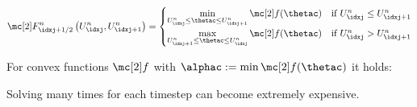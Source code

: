 \begin{defnbox}\nospacing
    \begin{defn}\label{defn:godunov_flux}
        \begin{align}
          \Flux^{n}_{\idxj+1/2}\left(U_{\idxj}^{n},U_{\idxj+1}^{n}\right)=
          \begin{cases}
            \min\limits_{U_{\idxj}^{n}\leq\thetac\leq U_{\idxj+1}^{n}}\flux(\thetac)&\text{if }U_{\idxj}^{n}\leq U_{\idxj+1}^{n}\\
            \max\limits_{U_{\idxj+1}^{n}\leq\thetac\leq U_{\idxj}^{n}}\flux(\thetac)&\text{if }U_{\idxj}^{n}> U_{\idxj+1}^{n}\label{eq:godunov_flux}
          \end{cases}
        \end{align}
    \end{defn}
\end{defnbox}
\begin{corbox}\nospacing
    \begin{cor}\label{cor:godunov_flux_for_convex_functions}\leavevmode
        For convex functions $\flux$ with $\alphac:=\min\flux(\thetac)$ it holds:
    \end{cor}
\end{corbox}
\begin{sectionbox}\nospacing
\begin{conslist}
    \item Solving  many times for each timestep can become extremely expensive.
\end{conslist}
\end{sectionbox}
